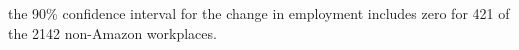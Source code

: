 the 90\% confidence interval for the change in employment includes zero for 421 of the 2142 non-Amazon workplaces.